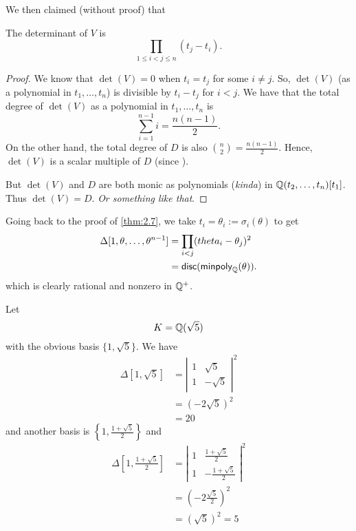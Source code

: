 We then claimed (without proof) that
\begin{claim*}
    The determinant of $V$ is
    \[\prod_{1\leq i < j\leq n}(t_j - t_i).\]
\end{claim*}
\begin{proof}
    We know that $\det(V) = 0$ when $t_i = t_j$ for some $i\neq j$. So, $\det(V)$ (as a polynomial in $t_1, \dots, t_n$) is divisible by $t_i - t_j$ for $i < j$. We have that the total degree of $\det(V)$ as a polynomial in $t_1, \dots, t_n$ is
    \[\sum_{i=1}^{n-1} i = \frac{n(n-1)}{2}.\]
    On the other hand, the total degree of $D$ is also $\binom{n}{2} = \frac{n(n-1)}{2}$. Hence, $\det(V)$ is a scalar multiple of $D$ (since ).

    But $\det(V)$ and $D$ are both monic as polynomials (\emph{kinda}) in $\mathbb Q(t_2, \dots, t_n)[t_1]$. Thus $\det(V) = D$. \emph{Or something like that}.
\end{proof}

Going back to the proof of \cref{thm:2.7}, we take $t_i = \theta_i := \sigma_i(\theta)$ to get
\begin{align*}
    \Delta[1, \theta, \dots, \theta^{n-1}] & = \prod_{i < j}(theta_i - \theta_j)^2  \\
                                           & = \mathsf{disc}(\operatorname{\mathsf{minpoly}}_\mathbb Q(\theta)).
\end{align*}
which is clearly rational and nonzero in $\mathbb Q^+$.

\begin{example}
    Let
    \[K = \mathbb Q(\sqrt{5})\]
    with the obvious basis $\{1, \sqrt{5}\}$. We have
    \begin{align*}
        \Delta[1, \sqrt{5}] & = \left|\begin{array}{cc}
                                          1 & \sqrt{5}  \\
                                          1 & -\sqrt{5}
                                      \end{array}\right|^2 \\
                            & = (-2\sqrt{5})^2             \\
                            & = 20
    \end{align*}
    and another basis is $\left\{1, \frac{1+\sqrt{5}}{2}\right\}$ and
    \begin{align*}
        \Delta\left[1, \frac{1+\sqrt{5}}{2}\right] & = \left|\begin{array}{cc}
                                                                 1 & \frac{1+\sqrt{5}}{2}  \\
                                                                 1 & -\frac{1+\sqrt{5}}{2}
                                                             \end{array}\right|^2 \\
                                                   & = (-2\frac{\sqrt{5}}{2})^2                      \\
                                                   & = (\sqrt{5})^2 = 5
    \end{align*}
\end{example}

